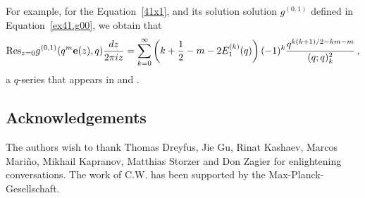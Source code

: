 \documentclass[12pt,reqno]{amsart}
\theoremstyle{definition}
\def\Res{\mathrm{Res}}
\def\be{\begin{equation}}
\def\ee{\end{equation}}
\def\e{\bold e}
\begin{document}
For example, for the Equation~\eqref{41x1}, and its solution
solution $g^{(0,1)}$ defined in Equation~\eqref{ex41.g00}, we obtain that 
\be
    \Res_{z=0}g^{(0,1)}(q^{m}\e(z),q)\frac{dz}{2\pi iz}
    =
    \sum_{k=0}^{\infty}\left(k+\frac{1}{2}-m
  -2E^{(k)}_{1}(q)\right)(-1)^{k}\frac{q^{k(k+1)/2-km-m}}{(q;q)_{k}^{2}} \,,
\ee
a $q$-series that appears in \cite[Equ.13b]{GGM} and \cite[Equ.6]{GGMW:trivial}.

\subsection*{Acknowledgements} 

The authors wish to thank Thomas Dreyfus, Jie Gu, Rinat Kashaev, Marcos
Mari\~{n}o, Mikhail Kapranov, Matthias Storzer and Don Zagier for enlightening
conversations. The work of C.W. has been supported by the Max-Planck-Gesellschaft.


%


\end{document}
